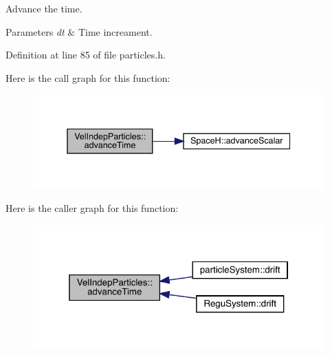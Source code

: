 Advance the time. 


\begin{DoxyParams}{Parameters}
{\em dt} & Time increament. \\
\hline
\end{DoxyParams}


Definition at line 85 of file particles.\+h.

Here is the call graph for this function\+:\nopagebreak
\begin{figure}[H]
\begin{center}
\leavevmode
\includegraphics[width=338pt]{class_vel_indep_particles_a024d302cca3027451619a9346ecc24a4_cgraph}
\end{center}
\end{figure}
Here is the caller graph for this function\+:\nopagebreak
\begin{figure}[H]
\begin{center}
\leavevmode
\includegraphics[width=319pt]{class_vel_indep_particles_a024d302cca3027451619a9346ecc24a4_icgraph}
\end{center}
\end{figure}
\mbox{\label{class_vel_indep_particles_adb74d0445c84c0b705c25a8c50f6bc00}} 
